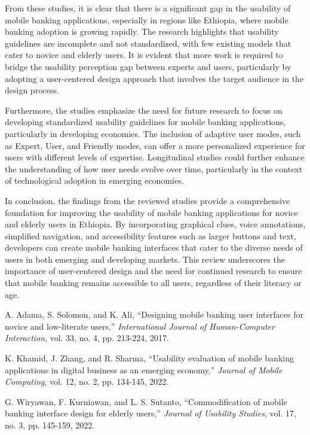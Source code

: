 \documentclass[a4paper,12pt]{report}
\begin{document}
From these studies, it is clear that there is a significant gap in the usability of mobile banking applications, especially in regions like Ethiopia, where mobile banking adoption is growing rapidly. The research highlights that usability guidelines are incomplete and not standardized, with few existing models that cater to novice and elderly users. It is evident that more work is required to bridge the usability perception gap between experts and users, particularly by adopting a user-centered design approach that involves the target audience in the design process.

Furthermore, the studies emphasize the need for future research to focus on developing standardized usability guidelines for mobile banking applications, particularly in developing economies. The inclusion of adaptive user modes, such as Expert, User, and Friendly modes, can offer a more personalized experience for users with different levels of expertise. Longitudinal studies could further enhance the understanding of how user needs evolve over time, particularly in the context of technological adoption in emerging economies.

In conclusion, the findings from the reviewed studies provide a comprehensive foundation for improving the usability of mobile banking applications for novice and elderly users in Ethiopia. By incorporating graphical clues, voice annotations, simplified navigation, and accessibility features such as larger buttons and text, developers can create mobile banking interfaces that cater to the diverse needs of users in both emerging and developing markets. This review underscores the importance of user-centered design and the need for continued research to ensure that mobile banking remains accessible to all users, regardless of their literacy or age.

\vfill

\renewcommand{\bibname}{References}
\begin{thebibliography}{1}

  A. Adama, S. Solomon, and K. Ali, ``Designing mobile banking user interfaces for novice and low-literate users,'' \textit{International Journal of Human-Computer Interaction}, vol. 33, no. 4, pp. 213-224, 2017.

  K. Khamid, J. Zhang, and R. Sharma, ``Usability evaluation of mobile banking applications in digital business as an emerging economy,'' \textit{Journal of Mobile Computing}, vol. 12, no. 2, pp. 134-145, 2022.

  G. Wiryawan, F. Kurniawan, and L. S. Sutanto, ``Commodification of mobile banking interface design for elderly users,'' \textit{Journal of Usability Studies}, vol. 17, no. 3, pp. 145-159, 2022.

\end{thebibliography}
\end{document}

